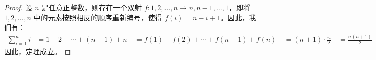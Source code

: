 \begin{proof}
设 $n$ 是任意正整数，则存在一个双射 $f: {1,2,\dots,n} \rightarrow {n,n-1,\dots,1}$，即将 ${1,2,\dots,n}$ 中的元素按照相反的顺序重新编号，使得 $f(i) = n-i+1$。因此，我们有：
\begin{align*}
\sum_{i=1}^n i &= 1 + 2 + \cdots + (n-1) + n \
&= f(1) + f(2) + \cdots + f(n-1) + f(n) \
&= (n+1) \cdot \frac{n}{2} \
&= \frac{n(n+1)}{2}
\end{align*}
因此，定理成立。
\end{proof}

